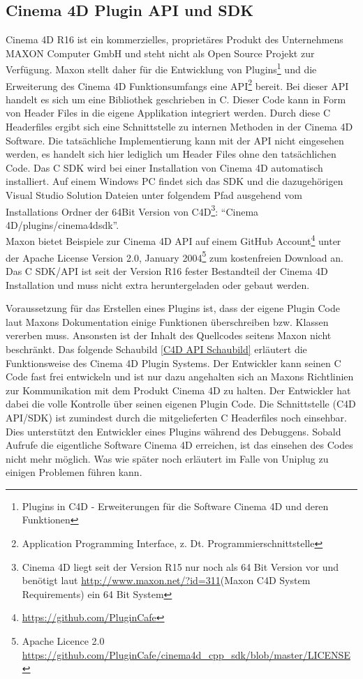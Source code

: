 \documentclass[pagesize, paper=a4, fontsize=12pt, titlepage=true, headings=small, headnosepline, abstractoff, liststotoc, nochapterprefix, plainheadsepline, twoside]{scrreprt}
\newcommand{\CPP}{C\nolinebreak\hspace{-.05em}\raisebox{.4ex}{\tiny\bf +}\nolinebreak\hspace{-.10em}\raisebox{.4ex}{\tiny\bf +}}
\newcommand{\CPPS}{C\nolinebreak\hspace{-.05em}\raisebox{.4ex}{\tiny\bf +}\nolinebreak\hspace{-.10em}\raisebox{.4ex}{\tiny\bf +} }
\begin{document}
\subsection{Cinema 4D Plugin API und SDK}
Cinema 4D R16 \autocite{MaxonC4d2014} ist ein kommerzielles, proprietäres Produkt des Unternehmens MAXON Computer GmbH und steht nicht als Open Source Projekt zur Verfügung. Maxon stellt daher für die Entwicklung von Plugins\footnote{Plugins in C4D - Erweiterungen für die Software Cinema 4D und deren Funktionen} und die Erweiterung des Cinema 4D Funktionsumfangs eine API\footnote{Application Programming Interface, z. Dt. Programmierschnittstelle} bereit. Bei dieser API handelt es sich um eine Bibliothek geschrieben in \CPP. Dieser Code kann in Form von Header Files in die eigene Applikation integriert werden. Durch diese \CPPS Headerfiles ergibt sich eine Schnittstelle zu internen Methoden in der Cinema 4D Software. Die tatsächliche Implementierung kann mit der API nicht eingesehen werden, es handelt sich hier lediglich um Header Files ohne den tatsächlichen Code. Das \CPPS SDK wird bei einer Installation von Cinema 4D automatisch installiert. Auf einem Windows PC findet sich das SDK und die dazugehörigen Visual Studio Solution Dateien unter folgendem Pfad ausgehend vom Installations Ordner der 64Bit Version von C4D\footnote{Cinema 4D liegt seit der Version R15 nur noch als 64 Bit Version vor und benötigt laut \url{http://www.maxon.net/?id=311}(Maxon C4D System Requirements) ein 64 Bit System}: {“Cinema 4D/plugins/cinema4dsdk”}.
\\
Maxon bietet Beispiele zur Cinema 4D API auf einem GitHub Account\footnote{\url{https://github.com/PluginCafe}} unter der Apache License Version 2.0, January 2004\footnote{Apache Licence 2.0 \url{https://github.com/PluginCafe/cinema4d_cpp_sdk/blob/master/LICENSE}} zum kostenfreien Download an. Das \CPPS SDK/API ist seit der Version R16 fester Bestandteil der Cinema 4D Installation und muss nicht extra heruntergeladen oder gebaut werden.

Voraussetzung für das Erstellen eines Plugins ist, dass der eigene Plugin Code laut Maxons Dokumentation einige Funktionen überschreiben bzw. Klassen vererben muss. Ansonsten ist der Inhalt des Quellcodes seitens Maxon nicht beschränkt. Das folgende Schaubild \ref{C4D API Schaubild} erläutert die Funktionsweise des Cinema 4D Plugin Systems. Der Entwickler kann seinen \CPPS Code fast frei entwickeln und ist nur dazu angehalten sich an Maxons Richtlinien zur Kommunikation mit dem Produkt Cinema 4D zu halten. Der Entwickler hat dabei die volle Kontrolle über seinen eigenen Plugin Code. Die Schnittstelle (C4D API/SDK) ist zumindest durch die mitgelieferten \CPPS Headerfiles noch einsehbar. Dies unterstützt den Entwickler eines Plugins während des Debuggens. Sobald Aufrufe die eigentliche Software Cinema 4D erreichen, ist das einsehen des Codes nicht mehr möglich. Was wie später noch erläutert im Falle von Uniplug zu einigen Problemen führen kann.
\end{document}
